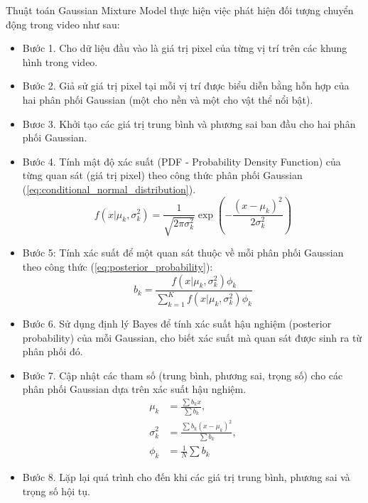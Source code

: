 \documentclass[a4paper]{article}
\begin{document}
Thuật toán Gaussian Mixture Model thực hiện việc phát hiện đối tượng chuyển động trong video như sau:
\begin{itemize}[label={}]
    \item Bước 1. Cho dữ liệu đầu vào là giá trị pixel của từng vị trí trên các khung hình trong video.
    \item Bước 2. Giả sử giá trị pixel tại mỗi vị trí được biểu diễn bằng hỗn hợp của hai phân phối Gaussian (một cho nền và một cho vật thể nổi bật).
    \item Bươc 3. Khởi tạo các giá trị trung bình và phương sai ban đầu cho hai phân phối Gaussian.
    \item Bước 4. Tính mật độ xác suất (PDF - Probability Density Function) của từng quan sát (giá trị pixel) theo công thức phân phối Gaussian (\ref{eq:conditional_normal_distribution}).
    \begin{equation}
        f(x|\mu_k, \sigma_k^2) = \frac{1}{\sqrt{2\pi \sigma_k^2}} \exp\left(-\frac{(x-\mu_k)^2}{2\sigma_k^2}\right)
        \label{eq:conditional_normal_distribution}
    \end{equation}
    \item Bước 5: Tính xác suất để một quan sát thuộc về mỗi phân phối Gaussian theo công thức (\ref{eq:posterior_probability}):
    \begin{equation}
        b_k = \frac{f(x|\mu_k, \sigma_k^2) \phi_k}{\sum_{k=1}^K f(x|\mu_k, \sigma_k^2) \phi_k}
        \label{eq:posterior_probability}
    \end{equation}
    \item Bước 6. Sử dụng định lý Bayes để tính xác suất hậu nghiệm (posterior probability) của mỗi Gaussian, cho biết xác suất mà quan sát được sinh ra từ phân phối đó.
    \item Bước 7. Cập nhật các tham số (trung bình, phương sai, trọng số) cho các phân phối Gaussian dựa trên xác suất hậu nghiệm.
    \begin{equation}
        \begin{aligned}
            \mu_k &= \frac{\sum b_k x}{\sum b_k}, \\
            \sigma_k^2 &= \frac{\sum b_k (x - \mu_k)^2}{\sum b_k}, \\
            \phi_k &= \frac{1}{N} \sum b_k
        \end{aligned}
        \label{eq:parameter_updates}
    \end{equation}
    \item Bước 8. Lặp lại quá trình cho đến khi các giá trị trung bình, phương sai và trọng số hội tụ.
\end{itemize}
\newpage
\end{document}
